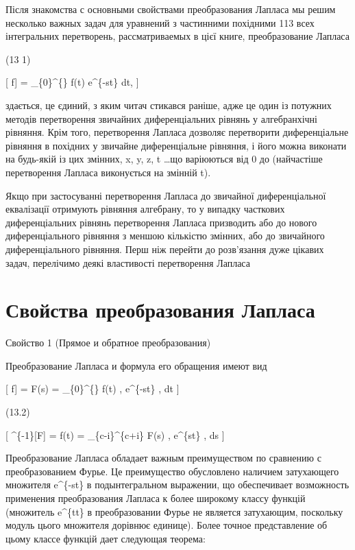 \documentclass[
  ukrainian,
]{article}
\begin{document}
Після знакомства с основными свойствами преобразования Лапласа мы решим
несколько важных задач для уравнений з частинними похідними 113 всех
інтегральних перетворень, рассматриваемых в цієї книге, преобразование
Лапласа

(13 1)

{[} \mathscr{Z}{[}f{]} = \int\_\{0\}\^{}\{\infty\} f(t) e\^{}\{-st\} dt,
{]}

здається, це єдиний, з яким читач стикався раніше, адже це один із
потужних методів перетворення звичайних диференціальних рівнянь у
алгебранхічні рівняння. Крім того, перетворення Лапласа дозволяє
перетворити диференціальне рівняння в похідних у звичайне диференціальне
рівняння, і його можна виконати на будь-якій із цих змінних, x, y, z, t
\ldots що варіюються від 0 до \infty (найчастіше перетворення Лапласа
виконується на змінній t).

Якщо при застосуванні перетворення Лапласа до звичайної диференціальної
еквалізації отримують рівняння алгебрану, то у випадку часткових
диференціальних рівнянь перетворення Лапласа призводить або до нового
диференціального рівняння з меншою кількістю змінних, або до звичайного
диференціального рівняння. Перш ніж перейти до розв'язання дуже цікавих
задач, перелічимо деякі властивості перетворення Лапласа

\section{Свойства преобразования
Лапласа}\label{ux441ux432ux43eux439ux441ux442ux432ux430-ux43fux440ux435ux43eux431ux440ux430ux437ux43eux432ux430ux43dux438ux44f-ux43bux430ux43fux43bux430ux441ux430}

Свойство 1 (Прямое и обратное преобразования)

Преобразование Лапласа и формула его обращения имеют вид

{[} \mathscr{L}{[}f{]} = F(s) = \int\_\{0\}\^{}\{\infty\} f(t) ,
e\^{}\{-st\} , dt \quad {} {]}

(13.2)

{[} \^{}\{-1\}{[}F{]} = f(t) = 
\int\_\{c-i\infty\}\^{}\{c+i\infty\} F(s) , e\^{}\{st\} , ds
\quad {} {]}

Преобразование Лапласа обладает важным преимуществом по сравнению с
преобразованием Фурье. Це преимущество обусловлено наличием затухающего
множителя e\^{}\{-st\} в подынтегральном выражении, що обеспечивает
возможность применения преобразования Лапласа к более широкому классу
функцій (множитель e\^{}\{t\xi t\} в преобразовании Фурье не является
затухающим, поскольку модуль цього множителя дорівнює единице). Более
точное представление об цьому классе функцій дает следующая теорема:
\end{document}
